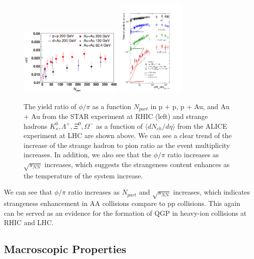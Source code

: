 \begin{figure}[hbtp]
\begin{center}
\includegraphics[width=0.45\textwidth]{Figures/Chapter1/STARPhiOverPi.png}
\includegraphics[width=0.30\textwidth]{Figures/Chapter1/ALICEStrange.png}
\caption{The yield ratio of $\phi/\pi$ as a function $N_{part}$ in p + p, p + Au, and Au + Au from the STAR experiment at RHIC (left) and strange hadrons $K^0_s, \Lambda^+, \Xi^0, \Omega^-$ as a function of $\langle dN_{ch}/d\eta \rangle$ from the ALICE experiment at LHC are shown above. We can see a clear trend of the increase of the strange hadron to pion ratio as the event multiplicity increases. In addition, we also see that the $\phi/\pi$ ratio increases as $\sqrt {s_{NN}}$ increases, which suggests the strangeness content enhances as the temperature of the system increase.}
\label{PhiRAA}
\end{center}
\end{figure}   

We can see that $\phi/\pi$ ratio increases as $N_{part}$ and $\sqrt {s_{NN}}$ increases, which indicates strangeness enhancement in AA collisions compare to pp collisions. This again can be served as an evidence for the formation of QGP in heavy-ion collisions at RHIC and LHC. 


\subsection{Macroscopic Properties}

